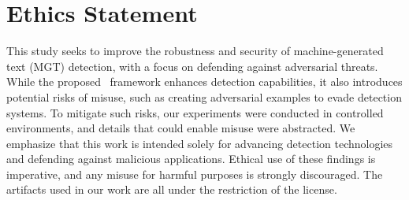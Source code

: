 \section*{Ethics Statement}

This study seeks to improve the robustness and security of machine-generated text (MGT) detection, with a focus on defending against adversarial threats. While the proposed \modelname\ framework enhances detection capabilities, it also introduces potential risks of misuse, such as creating adversarial examples to evade detection systems. To mitigate such risks, our experiments were conducted in controlled environments, and details that could enable misuse were abstracted. We emphasize that this work is intended solely for advancing detection technologies and defending against malicious applications. Ethical use of these findings is imperative, and any misuse for harmful purposes is strongly discouraged.
The artifacts used in our work are all under the restriction of the license.